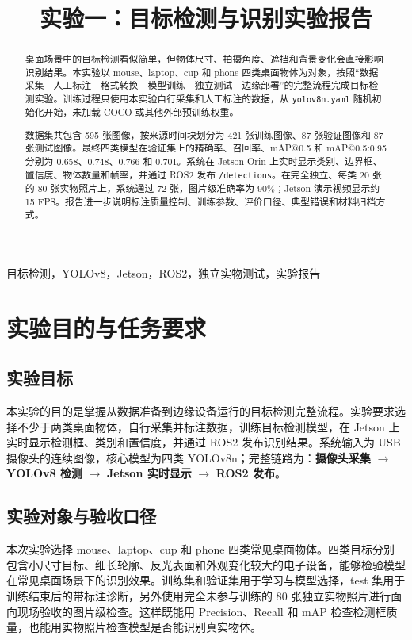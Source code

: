 \documentclass[11pt,conference,a4paper]{IEEEtran}
\newcommand{\code}[1]{\texttt{\footnotesize #1}}
\newcommand{\markterm}[1]{\textcolor{Accent}{\textbf{#1}}}
\begin{document}
\title{实验一：目标检测与识别实验报告}
\author{
}
\maketitle
\thispagestyle{fancy}

\begin{abstract}
桌面场景中的目标检测看似简单，但物体尺寸、拍摄角度、遮挡和背景变化会直接影响识别结果。本实验以 mouse、laptop、cup 和 phone 四类桌面物体为对象，按照“数据采集—人工标注—格式转换—模型训练—独立测试—边缘部署”的完整流程完成目标检测实验。训练过程只使用本实验自行采集和人工标注的数据，从 \code{yolov8n.yaml} 随机初始化开始，未加载 COCO 或其他外部预训练权重。

数据集共包含 595 张图像，按来源时间块划分为 421 张训练图像、87 张验证图像和 87 张测试图像。最终四类模型在验证集上的精确率、召回率、mAP@0.5 和 mAP@0.5:0.95 分别为 0.658、0.748、0.766 和 0.701。系统在 Jetson Orin 上实时显示类别、边界框、置信度、物体数量和帧率，并通过 ROS2 发布 \code{/detections}。在完全独立、每类 20 张的 80 张实物照片上，系统通过 72 张，图片级准确率为 90\%；Jetson 演示视频显示约 15 FPS。报告进一步说明标注质量控制、训练参数、评价口径、典型错误和材料归档方式。
\end{abstract}

\begin{IEEEkeywords}
目标检测，YOLOv8，Jetson，ROS2，独立实物测试，实验报告
\end{IEEEkeywords}

\section{实验目的与任务要求}
\subsection{实验目标}
本实验的目的是掌握从数据准备到边缘设备运行的目标检测完整流程。实验要求选择不少于两类桌面物体，自行采集并标注数据，训练目标检测模型，在 Jetson 上实时显示检测框、类别和置信度，并通过 ROS2 发布识别结果。系统输入为 USB 摄像头的连续图像，核心模型为四类 YOLOv8n；完整链路为：\markterm{摄像头采集} $\rightarrow$ \markterm{YOLOv8 检测} $\rightarrow$ \markterm{Jetson 实时显示} $\rightarrow$ \markterm{ROS2 发布}。

\subsection{实验对象与验收口径}
本次实验选择 mouse、laptop、cup 和 phone 四类常见桌面物体。四类目标分别包含小尺寸目标、细长轮廓、反光表面和外观变化较大的电子设备，能够检验模型在常见桌面场景下的识别效果。训练集和验证集用于学习与模型选择，test 集用于训练结束后的带标注诊断，另外使用完全未参与训练的 80 张独立实物照片进行面向现场验收的图片级检查。这样既能用 Precision、Recall 和 mAP 检查检测框质量，也能用实物照片检查模型是否能识别真实物体。
\end{document}
